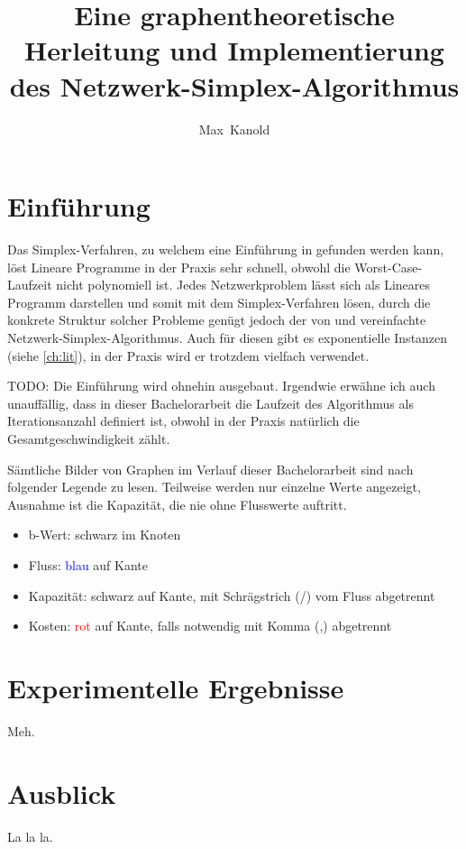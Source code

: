 \documentclass[11pt,a4paper,twoside,ngerman,openany]{scrbook}
\author{Max~Kanold}
\title{Eine graphentheoretische Herleitung und Implementierung des Netzwerk-Simplex-Algorithmus}
\theoremstyle{plain}
\theoremstyle{definition}
\begin{document}
\frontmatter
\maketitle
\cleardoublepage
\tableofcontents
\cleardoublepage

\mainmatter
\chapter{Einführung}
Das Simplex-Verfahren, zu welchem eine Einführung in \cite[Chvátal, 2002]{NSAbook} gefunden werden kann, löst Lineare Programme in der Praxis sehr schnell, obwohl die Worst-Case-Laufzeit nicht polynomiell ist. Jedes Netzwerkproblem lässt sich als Lineares Programm darstellen und somit mit dem Simplex-Verfahren lösen, durch die konkrete Struktur solcher Probleme genügt jedoch der von \cite[Dantzig, 1951]{erf1} und \cite[Orden, 1956]{erf2} vereinfachte Netzwerk-Simplex-Algorithmus. Auch für diesen gibt es exponentielle Instanzen (siehe \cref{ch:lit}), in der Praxis wird er trotzdem vielfach verwendet.

TODO: Die Einführung wird ohnehin ausgebaut. Irgendwie erwähne ich auch unauffällig, dass in dieser Bachelorarbeit die Laufzeit des Algorithmus als Iterationsanzahl definiert ist, obwohl in der Praxis natürlich die Gesamtgeschwindigkeit zählt.

Sämtliche Bilder von Graphen im Verlauf dieser Bachelorarbeit sind nach folgender Legende zu lesen. Teilweise werden nur einzelne Werte angezeigt, Ausnahme ist die Kapazität, die nie ohne Flusswerte auftritt.
\begin{itemize}\itemsep0em
    \item b-Wert: schwarz im Knoten
    \item Fluss: \textcolor{blue}{blau} auf Kante
    \item Kapazität: schwarz auf Kante, mit Schrägstrich (/) vom Fluss abgetrennt
    \item Kosten: \textcolor{red}{rot} auf Kante, falls notwendig mit Komma (,) abgetrennt
\end{itemize}





\chapter{Experimentelle Ergebnisse}\label{ch:erg}
Meh.

\chapter{Ausblick}
La la la.

\backmatter
{}

\end{document}
